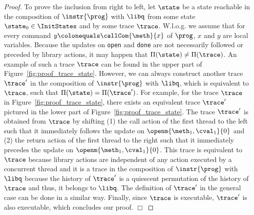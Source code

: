 \begin{proof}
To prove the inclusion from right to left, let $\state$ be a state reachable in the composition of $\instr{\prog}$ with $\libq$ from some state $\state_0\in\InitStates$
and by some trace $\trace$.
W.l.o.g. we assume that for every command $y \colonequals \callCom{\meth}{x}$ of $\prog$, $x$ and $y$ are local variables.
 Because the updates on {\tt open} and {\tt done} are not necessarily followed or preceded by library actions, it may happen that $\Pi(\state)\neq\Pi(\trace)$. An example of such a trace $\trace$ can be found in the upper part of Figure~\ref{fig:proof_trace_state}. However, we can always construct another trace $\trace'$ in the composition of $\instr{\prog}$ with $\libq$, which is equivalent to $\trace$, such that $\Pi(\state)=\Pi(\trace')$. For example, for the trace $\trace$ in Figure~\ref{fig:proof_trace_state}, there exists an equivalent trace $\trace'$ pictured in the lower part of Figure~\ref{fig:proof_trace_state}. The trace $\trace'$ is obtained from $\trace$ by shifting (1) the call action of the first thread to the left such that it immediately follows the update on $\openm{\meth_1,\cval_1}{0}$ and (2) the return action of the first thread to the right such that it immediately precedes the update on $\openm{\meth_1,\cval_1}{0}$. This trace is equivalent to $\trace$ because library actions are independent of any action executed by a concurrent thread and it is a trace in the composition of $\instr{\prog}$ with $\libq$ because the history of $\trace'$ is a quiescent permutation of the history of $\trace$ and thus, it belongs to $\libq$. The definition of $\trace'$ in the general case can be done in a similar way.
Finally, since $\trace$ is executable, $\trace'$ is also executable, which concludes our proof.
\hfill$\Box$
%
%
\end{proof}


